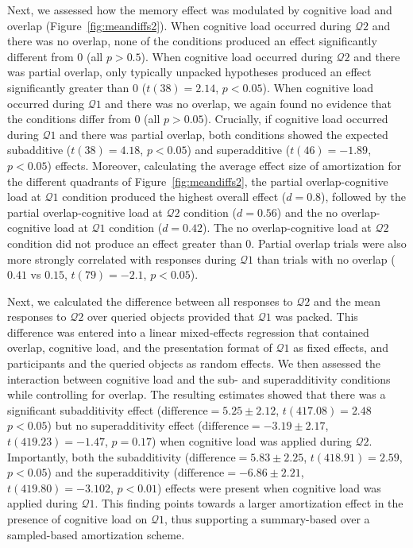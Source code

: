 Next, we assessed how the memory effect was modulated by cognitive load and overlap (Figure~\ref{fig:meandiffs2}). When cognitive load occurred during $\mathcal{Q}2$ and there was no overlap, none of the conditions produced an effect significantly different from 0 (all $p>0.5$). When cognitive load occurred during $\mathcal{Q}2$ and there was partial overlap, only typically unpacked hypotheses produced an effect significantly greater than 0 ($t(38)=2.14$, $p<0.05$). When cognitive load occurred during $\mathcal{Q}1$ and there was no overlap, we again found no evidence that the conditions differ from 0 (all $p>0.05$). Crucially, if cognitive load occurred during $\mathcal{Q}1$ and there was partial overlap, both conditions showed the expected subadditive ($t(38)=4.18$, $p<0.05$) and superadditive ($t(46)=-1.89$, $p<0.05$) effects. Moreover, calculating the average effect size of amortization for the different quadrants of Figure~\ref{fig:meandiffs2}, the partial overlap-cognitive load at $\mathcal{Q}1$ condition produced the highest overall effect ($d=0.8$), followed by the partial overlap-cognitive load at $\mathcal{Q}2$ condition ($d=0.56$) and the no overlap-cognitive load at $\mathcal{Q}1$ condition ($d=0.42$). The no overlap-cognitive load at $\mathcal{Q}2$ condition did not produce an effect greater than 0. Partial overlap trials were also more strongly correlated with responses during $\mathcal{Q}1$ than trials with no overlap ($0.41$ vs $0.15$, $t(79)=-2.1$, $p<0.05$).

Next, we calculated the difference between all responses to $\mathcal{Q}2$ and the mean responses to $\mathcal{Q}2$ over queried objects provided that $\mathcal{Q}1$ was packed. This difference was entered into a linear mixed-effects regression that contained overlap, cognitive load, and the presentation format of $\mathcal{Q}1$ as fixed effects, and participants and the queried objects as random effects. We then assessed the interaction between cognitive load and the sub- and superadditivity conditions while controlling for overlap. The resulting estimates showed that there was a significant subadditivity effect ($\text{difference}=5.25\pm2.12$, $t(417.08)=2.48$  $p<0.05$) but no superadditivity effect ($\text{difference}=-3.19\pm2.17$, $t(419.23)=-1.47$, $p=0.17$) when cognitive load was applied during $\mathcal{Q}2$. Importantly, both the subadditivity ($\text{difference}=5.83\pm 2.25$, $t(418.91)=2.59$, $p<0.05$) and the superadditivity ($\text{difference}=-6.86\pm2.21$, $t(419.80)=-3.102$, $p<0.01$) effects were present when cognitive load was applied during $\mathcal{Q}1$. This finding points towards a larger amortization effect in the presence of cognitive load on $\mathcal{Q}1$, thus supporting a summary-based over a sampled-based amortization scheme.

